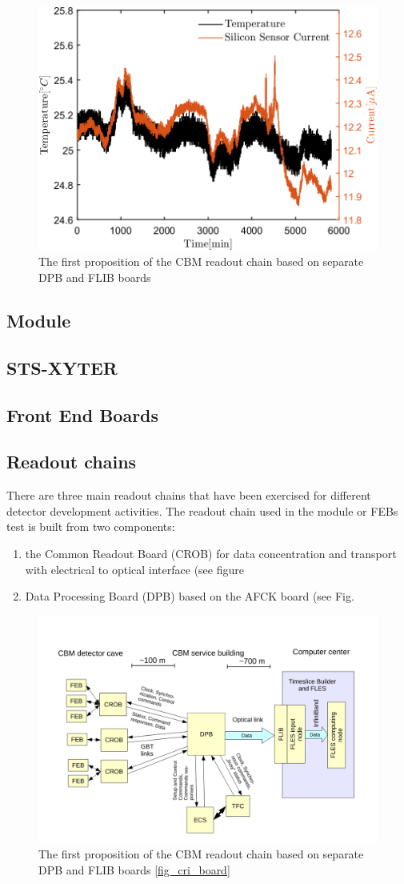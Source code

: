 \begin{figure}[!h]
\centering
\includegraphics[width=0.65\columnwidth]{Chapter2/images/currenttempnobeam.png}
\caption{The first proposition of the CBM readout chain based on separate DPB and FLIB boards \cite{CRI}}
\label{fig_leakage1}
\end{figure}



\subsection{Module}
\subsection{STS-XYTER}
\subsection{Front End Boards}
\label{module}
\subsection{Readout chains}
\label{readout}
\label{DAQ}
There are three main readout chains that have been exercised for different detector development activities.  
The readout chain used in the module or FEBs test is built from two components: 
\begin{enumerate}
    \item the Common Readout Board (\gls{CROB}) for data concentration and transport with electrical to optical interface (see figure 
    \item Data Processing Board (DPB) based on the AFCK board (see Fig.
\end{enumerate}

\begin{figure}[!h]
\centering
\includegraphics[width=0.65\columnwidth]{Chapter2/images/DPB.png}
\caption{The first proposition of the CBM readout chain based on separate DPB and FLIB boards \ref{fig_cri_board}}
\label{fig_dpb_scheme}
\end{figure}

